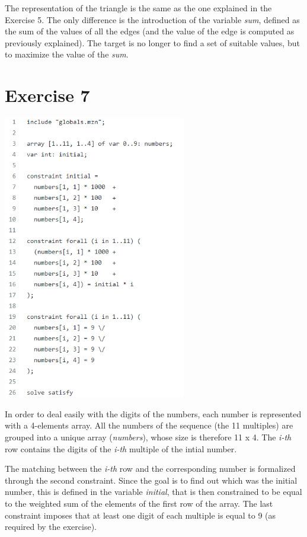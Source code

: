 \documentclass{article}
\begin{document}
The representation of the triangle is the same as the one explained in the Exercise 5. The only
difference is the introduction of the variable \textit{sum}, defined as the sum of the values of 
all the edges (and the value of the edge is computed as previously explained).
The target is no longer to find a set of suitable values, but to maximize the value of the \textit{sum}.

\section{Exercise 7}
\vspace{0.2cm}
\includegraphics[width=8cm]{img/Es7.png}
\vspace{0.2cm}

In order to deal easily with the digits of the numbers, each number is represented with a 4-elements
array. All the numbers of the sequence (the 11 multiples) are grouped into a unique array (\textit{numbers}),
whose size is therefore 11 x 4. The \textit{i-th} row contains the digits of the \textit{i-th} multiple of
the intial number. 

The matching between the \textit{i-th} row and the corresponding number is formalized through
the second constraint. 
Since the goal is to find out which was the initial number, this is defined in the variable
\textit{initial}, that is then constrained to be equal to the weighted sum of the elements of the first
row of the array.
The last constraint imposes that at least one digit of each multiple is equal to 9 (as required by
the exercise).
\end{document}
